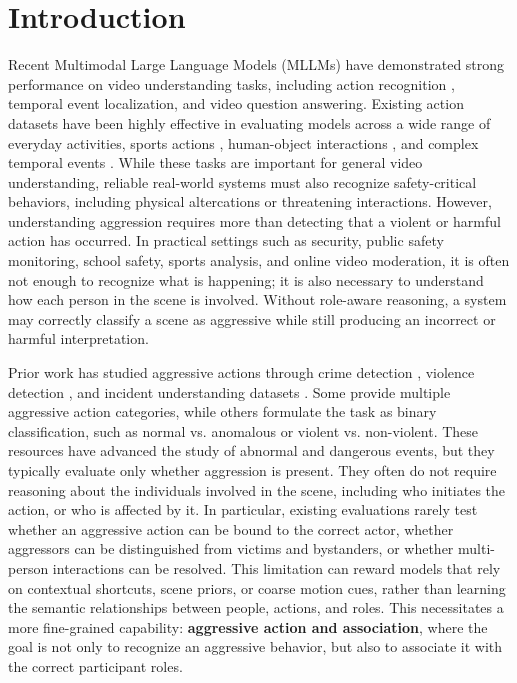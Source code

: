 

\section{Introduction}


Recent Multimodal Large Language Models (MLLMs) have demonstrated strong performance on video understanding tasks, including action recognition , temporal event localization, and video question answering. Existing action datasets have been highly effective in evaluating models across a wide range of everyday activities\cite{kinetics, ssv2, ucf101, hmdb51, activitynet}, sports actions \cite{multisports, finegym}, human-object interactions \cite{charades, actiongenome}, and complex temporal events \cite{momentsintime, multithumos}. While these tasks are important for general video understanding, reliable real-world systems must also recognize safety-critical behaviors, including physical altercations or threatening interactions. However, understanding aggression requires more than detecting that a violent or harmful action has occurred. In practical settings such as security, public safety monitoring, school safety, sports analysis, and online video moderation, it is often not enough to recognize what is happening; it is also necessary to understand how each person in the scene is involved. Without role-aware reasoning, a system may correctly classify a scene as aggressive while still producing an incorrect or harmful interpretation.

Prior work has studied aggressive actions through crime detection \cite{ucfcrimes, crxk}, violence detection \cite{xdviolence, cabad, moviesfight, violentflows, rwf, dvd, vid}, and incident understanding datasets \cite{iard, shanghaitech}. Some provide multiple aggressive action categories, while others formulate the task as binary classification, such as normal vs. anomalous or violent vs. non-violent. These resources have advanced the study of abnormal and dangerous events, but they typically evaluate only whether aggression is present. They often do not require reasoning about the individuals involved in the scene, including who initiates the action, or who is affected by it. In particular, existing evaluations rarely test whether an aggressive action can be bound to the correct actor, whether aggressors can be distinguished from victims and bystanders, or whether multi-person interactions can be resolved. This limitation can reward models that rely on contextual shortcuts, scene priors, or coarse motion cues, rather than learning the semantic relationships between people, actions, and roles. This necessitates a more fine-grained capability: \textbf{aggressive action and association}, where the goal is not only to recognize an aggressive behavior, but also to associate it with the correct participant roles.

